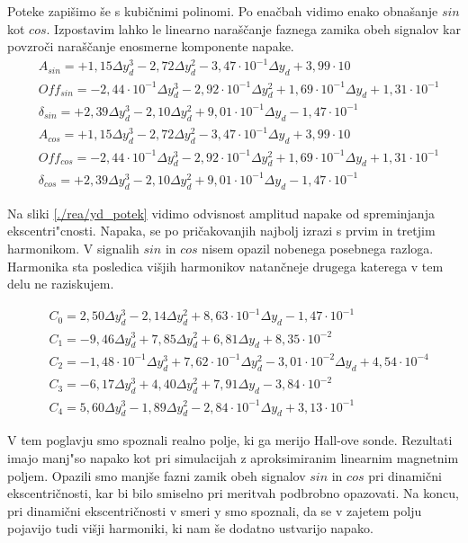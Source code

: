 Poteke zapišimo še s kubičnimi polinomi. Po enačbah vidimo enako obnašanje $sin$ kot $cos$. Izpostavim lahko le linearno naraščanje faznega zamika obeh signalov kar povzroči naraščanje enosmerne komponente napake.
\begin{eqnarray}
&A_{sin} = +1,15\Delta y_d^3-2,72\Delta y_d^2-3,47\cdot 10^{-1}\Delta y_d+3,99\cdot 10\\     
&Off_{sin} = -2,44\cdot 10^{-1}\Delta y_d^3-2,92\cdot 10^{-1}\Delta y_d^2+1,69\cdot 10^{-1}\Delta y_d+1,31\cdot 10^{-1}\\   
&\delta_{sin} = +2,39\Delta y_d^3-2,10\Delta y_d^2+9,01\cdot 10^{-1}\Delta y_d-1,47\cdot 10^{-1}\\
&A_{cos} = +1,15\Delta y_d^3-2,72\Delta y_d^2-3,47\cdot 10^{-1}\Delta y_d+3,99\cdot 10\\     
&Off_{cos} = -2,44\cdot 10^{-1}\Delta y_d^3-2,92\cdot 10^{-1}\Delta y_d^2+1,69\cdot 10^{-1}\Delta y_d+1,31\cdot 10^{-1}\\   
&\delta_{cos} = +2,39\Delta y_d^3-2,10\Delta y_d^2+9,01\cdot 10^{-1}\Delta y_d-1,47\cdot 10^{-1} 
\end{eqnarray}

Na sliki \ref{./rea/yd_potek} vidimo odvisnost amplitud napake od spreminjanja ekscentri"cnosti. Napaka, se po pričakovanjih najbolj izrazi s prvim in tretjim harmonikom. V signalih $sin$ in $cos$ nisem opazil nobenega posebnega razloga. Harmonika sta posledica višjih harmonikov natančneje drugega katerega v tem delu ne raziskujem.



\begin{eqnarray}
&C_0 =2,50\Delta y_d^{3}-2,14\Delta y_d^{2}+8,63\cdot 10^{-1}\Delta y_d-1,47\cdot 10^{-1} \\                           
&C_1 =-9,46\Delta y_d^{3}+7,85\Delta y_d^{2}+6,81\Delta y_d+8,35\cdot 10^{-2} \\                                       
&C_2 =-1,48\cdot 10^{-1}\Delta y_d^{3}+7,62\cdot 10^{-1}\Delta y_d^{2}-3,01\cdot 10^{-2}\Delta y_d+4,54\cdot 10^{-4} \\
&C_3 =-6,17\Delta y_d^{3}+4,40\Delta y_d^{2}+7,91\Delta y_d-3,84\cdot 10^{-2} \\                                       
&C_4 =5,60\Delta y_d^{3}-1,89\Delta y_d^{2}-2,84\cdot 10^{-1}\Delta y_d+3,13\cdot 10^{-1}       
\end{eqnarray}



V tem poglavju smo spoznali realno polje, ki ga merijo Hall-ove sonde. Rezultati imajo manj"so napako kot pri simulacijah z aproksimiranim linearnim magnetnim poljem. Opazili smo manjše fazni zamik obeh signalov $sin$ in $cos$ pri dinamični ekscentričnosti, kar bi bilo smiselno pri meritvah podbrobno opazovati. Na koncu, pri dinamični ekscentričnosti v smeri y smo spoznali, da se v zajetem polju pojavijo tudi višji harmoniki, ki nam še dodatno ustvarijo napako. 